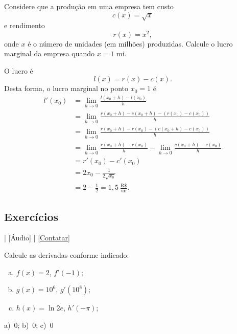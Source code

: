 \begin{exeresol}
  Considere que a produção em uma empresa tem custo
  \begin{equation}
    c(x) = \sqrt{x}
  \end{equation}
  e rendimento
  \begin{equation}
    r(x) = x^2,
  \end{equation}
  onde $x$ é o número de unidades (em milhões) produzidas. Calcule o lucro marginal da empresa quando $x=1$ mi.
\end{exeresol}
\begin{resol}
  O lucro é
  \begin{equation}
    l(x) = r(x) - c(x).
  \end{equation}
  Desta forma, o lucro marginal no ponto $x_0=1$ é
  \begin{align}
    l'(x_0) &= \lim_{h\to 0} \frac{l(x_0+h)-l(x_0)}{h}\\
            &= \lim_{h\to 0} \frac{r(x_0+h)-c(x_0+h)-(r(x_0)-c(x_0))}{h}\\
            &= \lim_{h\to 0} \frac{r(x_0+h)-r(x_0) - (c(x_0+h)-c(x_0))}{h}\\
            &= \lim_{h\to 0} \frac{r(x_0+h)-r(x_0)}{h} - \lim_{h\to 0} \frac{c(x_0+h)-c(x_0)}{h}\\
            &= r'(x_0) - c'(x_0)\\
            &= 2x_0 - \frac{1}{2\sqrt{x_0}}\\
            &= 2 - \frac{1}{2} = 1,5~\frac{\text{R\$}}{\text{un}}.
  \end{align}
\end{resol}


\subsection*{Exercícios}

\begin{flushright}
  [Vídeo] | [Áudio] | \href{https://phkonzen.github.io/notas/contato.html}{[Contatar]}
\end{flushright}

\begin{exer}
  Calcule as derivadas conforme indicado:
  \begin{enumerate}[a)]
  \item $f(x) = 2$, $f'(-1)$;
  \item $g(x) = 10^6$, $g'(10^8)$;
  \item $h(x) = \ln 2e$, $h'(-\pi)$;
  \end{enumerate}
\end{exer}
\begin{resp}
  a)~$0$; b)~$0$; c)~$0$
\end{resp}

